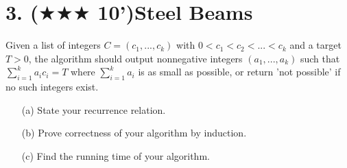 \documentclass{article}
\begin{document}
\section*{3. ($\bigstar\bigstar\bigstar$ 10')Steel Beams}
Given a list of integers $C=(c_1,...,c_k)$ with $0<c_1<c_2<...<c_k$ and a target $T>0$, the algorithm should output nonnegative integers $(a_1,...,a_k)$ such that $\sum\limits_{i=1}^k a_ic_i=T$ where $\sum\limits_{i=1}^k a_i$ is as small as possible, or return 'not possible' if no such integers exist.
\begin{itemize}
\item[(a)]State your recurrence relation.
\item[(b)]Prove correctness of your algorithm by induction.
\item[(c)] Find the running time of your algorithm.
\end{itemize}
\end{document}
